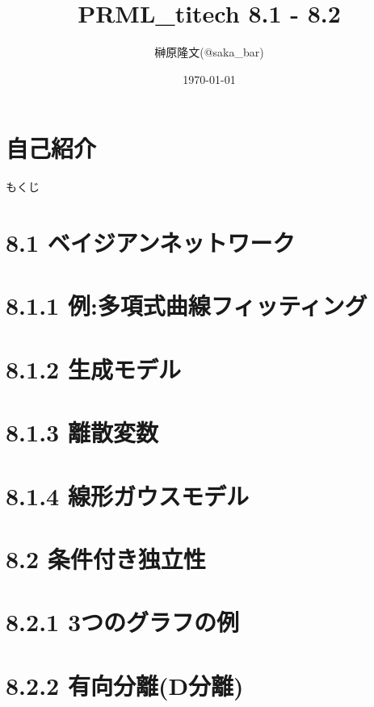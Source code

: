 \documentclass[dvipdfm]{beamer}
\title{PRML\_titech 8.1 - 8.2}
\author{榊原隆文(@saka\_bar)}
\date{\today}
\begin{document}
\maketitle

 \section*{自己紹介}
 

 \begin{frame}{もくじ}
  \tableofcontents
 \end{frame}

 \section{8.1 ベイジアンネットワーク}
 

 \section{8.1.1 例:多項式曲線フィッティング}
 

 \section{8.1.2 生成モデル}
 

 \section{8.1.3 離散変数}
 

 \section{8.1.4 線形ガウスモデル}
 

 \section{8.2 条件付き独立性}
 

 \section{8.2.1 3つのグラフの例}
 

 \section{8.2.2 有向分離(D分離)}
 
\end{document}

